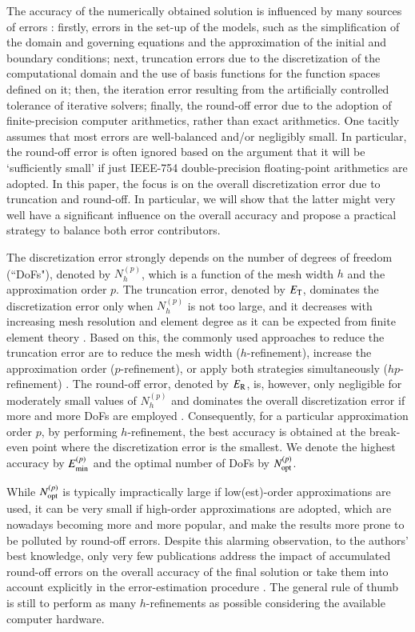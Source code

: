 \documentclass[review,3p]{elsarticle}
\begin{document}
The accuracy of the numerically obtained solution is influenced by many sources of errors \cite{ferziger2012computational}: firstly, errors in the set-up of the models, such as the simplification of the domain and governing equations and the approximation of the initial and boundary conditions; next, truncation errors due to the discretization of the computational domain and the use of basis functions for the function spaces defined on it; then, the iteration error resulting from the artificially controlled tolerance of iterative solvers; finally, the round-off error due to the adoption of finite-precision computer arithmetics, rather than exact arithmetics.
One tacitly assumes that most errors are well-balanced and/or negligibly small.
In particular, the round-off error is often ignored based on the argument that it will be `sufficiently small' if just IEEE-754 double-precision floating-point arithmetics \cite{zuras2008ieee} are adopted.
In this paper, the focus is on the overall discretization error due to truncation and round-off. In particular, we will show that the latter might very well have a significant influence on the overall accuracy and propose a practical strategy to balance both error contributors.

The discretization error strongly depends on the number of degrees of freedom (``DoFs"), denoted by $N_h^{(p)}$, which is a function of the mesh width $h$ and the approximation order $p$. The truncation error, denoted by ${E}_{\rm {T}}$, dominates the discretization error only when $N_h^{(p)}$ is not too large, and it decreases with increasing mesh resolution and element degree as it can be expected from finite element theory \cite{gockenbach2006understanding}. Based on this, the commonly used approaches to reduce the truncation error are to reduce the mesh width ($h$-refinement), increase the approximation order ($p$-refinement), or apply both strategies simultaneously ($hp$-refinement) \cite{guo1986hp}. 
The round-off error, denoted by ${E}_{\rm R}$, is, however, only negligible for moderately small values of $N_h^{(p)}$ and dominates the overall discretization error if more and more DoFs are employed \cite{Babuska2018Roundoff}. 
Consequently, for a particular approximation order $p$, by performing $h$-refinement, the best accuracy is obtained at the break-even point where the discretization error is the smallest. We denote the highest accuracy by ${E}_{\rm {min}}^{(p)}$ and the optimal number of DoFs by $N_{\rm opt}^{(p)}$.

While $N_{\rm opt}^{(p)}$ is typically impractically large if low(est)-order approximations are used, it can be very small if high-order approximations are adopted, which are nowadays becoming more and more popular, and make the results more prone to be polluted by round-off errors.
Despite this alarming observation, to the authors’ best knowledge, only very few publications address the impact of accumulated round-off errors on the overall accuracy of the final solution \cite{ling1984numerical,mou2017example} or take them into account explicitly in the error-estimation procedure {\cite{ainsworth1992procedure,kelly1983posteriori}}.
The general rule of thumb is still to perform as many $h$-refinements as possible considering the available computer hardware.
\end{document}
